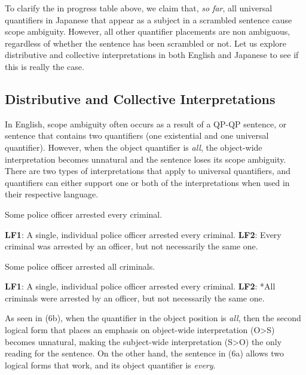 \documentclass[english, 11pt]{article}
\begin{document}
\newline
To clarify the in progress table above, we claim that, \emph{so far}, all universal quantifiers in Japanese that appear as a subject in a scrambled sentence cause scope ambiguity. However, all other quantifier placements are non ambiguous, regardless of whether the sentence has been scrambled or not. Let us explore distributive and collective interpretations in both English and Japanese to see if this is really the case.

\subsection{Distributive and Collective Interpretations}
In English, scope ambiguity often occurs as a result of a QP-QP sentence, or sentence that contains two quantifiers (one existential and one universal quantifier). However, when the object quantifier is \emph{all}, the object-wide interpretation becomes unnatural and the sentence loses its scope ambiguity. There are two types of interpretations that apply to universal quantifiers, and quantifiers can either support one or both of the interpretations when used in their respective language.
\begin {exe}
	\ex 
		\begin {xlist}
			\ex Some police officer arrested every criminal.
			\begin {xlist} 
				\ex \textbf{LF1}: A single, individual police officer arrested every criminal.
				\ex \textbf{LF2}: Every criminal was arrested by an officer, but not necessarily the same one.
			\end {xlist}
			\ex Some police officer arrested all criminals.
				\begin {xlist} 
					\ex \textbf{LF1}: A single, individual police officer arrested every criminal.
					\ex \textbf{LF2}: *All criminals were arrested by an officer, but not necessarily the same one.
				\end {xlist}
	\end {xlist}
\end {exe}
As seen in (6b), when the quantifier in the object position is \emph{all}, then the second logical form that places an emphasis on object-wide interpretation (O>S) becomes unnatural, making the subject-wide interpretation (S>O) the only reading for the sentence. On the other hand, the sentence in (6a) allows two logical forms that work, and its object quantifier is \emph{every}. 
\end{document}
